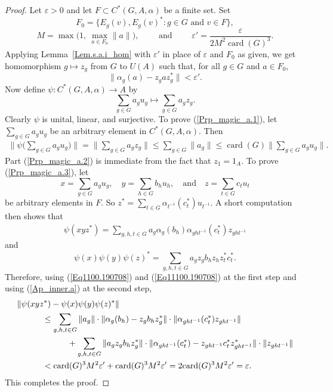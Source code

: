 \documentclass[10pt]{amsart}
\numberwithin{equation}{section}
\theoremstyle{definition}
\newcommand{\af}{\alpha}
\newcommand{\ep}{\varepsilon}
\newcommand{\card}{{\operatorname{card}}}
\newcommand{\hm}{homomorphism}
\newcommand{\CGAa}{C^* (G, A, \af)}
\newcommand{\Lem}[1]{Lemma~\ref{#1}}
\begin{document}
\begin{proof}
Let $\ep > 0$ and let $F \subset \CGAa$ be a finite set.
Set 
\[
F_0= \Big\{ E_g (v), E_g (v)^* \colon g \in G \mbox{ and } v \in F \Big\},
\]
\[
M= \max \Big(1, \ \max_{a \in F_0}   \| a \|  \Big),
\qquad
\mbox{ and }
\qquad
\ep'= \frac{\ep}{2 M^2 \card (G)^3}.
\]  
Applying \Lem{Lem.s.a.i_hom} with $\ep'$ in place of
$\ep$ and $F_0$ as given, we get \hm{} $g \mapsto z_g$
from $G$ to $U (A)$ such that, for all $g \in G$ and $a \in F_0$,
\begin{equation}\label{Ap_inner.a}
\| \af_g (a) - z_g a z_g^* \| < \ep'.
\end{equation}
Now define $\psi \colon \CGAa \to A$ by 
\[
\sum_{g \in G} a_g u_g \mapsto \sum_{g \in G } a_g z_g .
\]
Clearly $\psi$ is unital, linear, and surjective.
 To prove (\ref{Prp_magic_a.1}), let
 $\sum_{g\in G} a_g u_g$ be an arbitrary element in $\CGAa$. Then
\begin{align*}
\Bigg\| \psi \Bigg(\sum_{g\in G} a_g u_g \Bigg)\Bigg\|
= 
\Bigg\| \sum_{g \in G }  a_g z_g \Bigg\| 
\leq 
\sum_{g\in G} \|  a_g \| 
\leq 
\card (G) \Bigg\| \sum_{g\in G} a_g u_g \Bigg\|.
\end{align*}
Part (\ref{Prp_magic_a.2}) is immediate from the fact that $z_1=1_A$. 
To prove (\ref{Prp_magic_a.3}), let
\[
x=\sum_{g \in G} a_g u_g, 
\quad
y= \sum_{h\in G} b_h u_h, 
\quad
\mbox{and} 
\quad
z= \sum_{t\in G} c_t u_t
\]
 be arbitrary elements in $F$.
So 
$z^* =\sum_{t\in G} \alpha_{t^{-1}} (c^*_t) u_{t^{-1}}$. 
A short computation then shows that  
\begin{align}\label{Eq1100.190708}
\psi( xyz^* )  
=
 \sum_{g,h, t  \in G } a_g \alpha_{g} (b_h) \alpha_{ght^{-1}} (c^*_t) z_{gh t^{-1}}
\end{align}
and 
\begin{equation}\label{Eq11100.190708}
\psi(x) \psi(y) \psi(z)^*
=
  \sum_{g,h, t \in G } a_g z_g b_h z_h z^{*}_{t} c^{*}_{t}.
\end{equation}
Therefore, using (\ref{Eq1100.190708}) and (\ref{Eq11100.190708}) at the first step and
using (\ref{Ap_inner.a})  at the second step,
\begin{align*}
&\| \psi (xy z^*) - \psi (x) \psi(y) \psi(z)^*\| 
\\
&\hspace*{3em} {\mbox{}}\leq
\sum_{g,h, t  \in G} 
\|  a_g \| \cdot \| \alpha_{g} (b_h) -  z_g b_h z^*_g \| \cdot \|\alpha_{ght^{-1}} (c^{*}_t) z_{ght^{-1}} \|
\\&
\hspace*{6em} {\mbox{}}+
\sum_{g,h, t  \in G}
 \|  a_g z_g b_h z^*_g \| \cdot \| \alpha_{ght^{-1}} (c^{*}_{t})  -  z_{ght^{-1}} c^{*}_{t} z^*_{ght^{-1}} \| \cdot \| z_{ght^{-1}} \|
\\
&\hspace*{3em} {\mbox{}}
<
 \card(G)^3 M^2 \ep' + \card(G)^3 M^2 \ep' = 2 \card(G)^3 M^2 \ep' =\ep.
\end{align*}
This completes the proof.
\end{proof}
\end{document}
